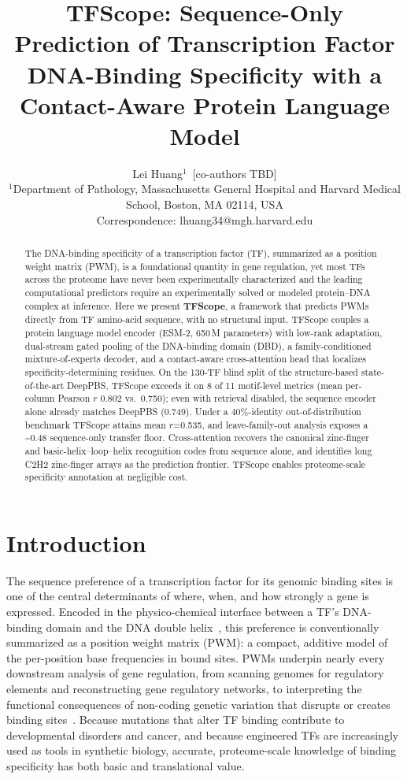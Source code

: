 \documentclass[11pt,letterpaper]{article}
\title{\textbf{TFScope: Sequence-Only Prediction of Transcription Factor
DNA-Binding Specificity with a Contact-Aware Protein Language Model}}
\author{
  Lei Huang$^{1}$~[co-authors TBD]\\[6pt]
  \small $^1$Department of Pathology, Massachusetts General Hospital and
         Harvard Medical School, Boston, MA 02114, USA\\
  \small Correspondence: lhuang34@mgh.harvard.edu
}
\date{}
\newcommand{\ts}{\textasciitilde}
\begin{document}
\maketitle

\begin{abstract}
\noindent
The DNA-binding specificity of a transcription factor (TF), summarized as a
position weight matrix (PWM), is a foundational quantity in gene regulation, yet
most TFs across the proteome have never been experimentally characterized and the
leading computational predictors require an experimentally solved or modeled
protein--DNA complex at inference. Here we present \textbf{TFScope}, a framework
that predicts PWMs directly from TF amino-acid sequence, with no structural input.
TFScope couples a protein language model encoder (ESM-2, 650\,M parameters) with
low-rank adaptation, dual-stream gated pooling of the DNA-binding domain (DBD), a
family-conditioned mixture-of-experts decoder, and a contact-aware cross-attention
head that localizes specificity-determining residues. On the 130-TF blind split of
the structure-based state-of-the-art DeepPBS, TFScope exceeds it on 8 of 11
motif-level metrics (mean per-column Pearson $r$ 0.802 vs.\ 0.750); even with
retrieval disabled, the sequence encoder alone already matches DeepPBS (0.749).
Under a 40\%-identity out-of-distribution benchmark TFScope attains mean $r$=0.535,
and leave-family-out analysis exposes a \ts0.48 sequence-only transfer floor.
Cross-attention recovers the canonical zinc-finger and basic-helix--loop--helix
recognition codes from sequence alone, and identifies long C2H2 zinc-finger arrays
as the prediction frontier. TFScope enables proteome-scale specificity annotation
at negligible cost.
\end{abstract}

\section*{Introduction}

The sequence preference of a transcription factor for its genomic binding sites is
one of the central determinants of where, when, and how strongly a gene is
expressed. Encoded in the physico-chemical interface between a TF's DNA-binding
domain and the DNA double helix~\cite{Stormo2000,Luscombe2001}, this preference is
conventionally summarized as a position weight matrix (PWM): a compact, additive
model of the per-position base frequencies in bound sites. PWMs underpin nearly
every downstream analysis of gene regulation, from scanning genomes for regulatory
elements and reconstructing gene regulatory networks, to interpreting the
functional consequences of non-coding genetic variation that disrupts or creates
binding sites~\cite{Deplancke2016,Zhou2017}. Because mutations that alter TF
binding contribute to developmental disorders and cancer, and because engineered
TFs are increasingly used as tools in synthetic biology, accurate, proteome-scale
knowledge of binding specificity has both basic and translational value.
\end{document}
